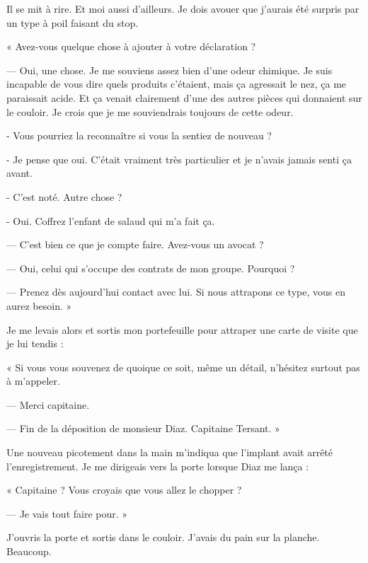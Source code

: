 Il se mit à rire. Et moi aussi d'ailleurs. Je dois avouer que j'aurais été surpris par un type à poil faisant du stop.

« Avez-vous quelque chose à ajouter à votre déclaration ?

— Oui, une chose. Je me souviens assez bien d'une odeur chimique. Je suis incapable de vous dire quels produits
c'étaient, mais ça agressait le nez, ça me paraissait acide. Et ça venait clairement d'une des autres pièces qui
donnaient sur le couloir. Je crois que je me souviendrais toujours de cette odeur.

- Vous pourriez la reconnaître si vous la sentiez de nouveau ?

- Je pense que oui. C'était vraiment très particulier et je n'avais jamais senti ça avant.

- C'est noté. Autre chose ?

- Oui. Coffrez l'enfant de salaud qui m'a fait ça.

— C'est bien ce que je compte faire. Avez-vous un avocat ?

— Oui, celui qui s'occupe des contrats de mon groupe. Pourquoi ?

— Prenez dès aujourd'hui contact avec lui. Si nous attrapons ce type, vous en aurez besoin. »

Je me levais alors et sortis mon portefeuille pour attraper une carte de visite que je lui tendis :

« Si vous vous souvenez de quoique ce soit, même un détail, n'hésitez surtout pas à m'appeler.

— Merci capitaine.

— Fin de la déposition de monsieur Diaz. Capitaine Tersant. »

Une nouveau picotement dans la main m'indiqua que l'implant avait arrêté l'enregistrement. Je me dirigeais vers la
porte lorsque Diaz me lança :

« Capitaine ? Vous croyais que vous allez le chopper ?

— Je vais tout faire pour. »

J'ouvris la porte et sortis dans le couloir. J'avais du pain sur la planche. Beaucoup.